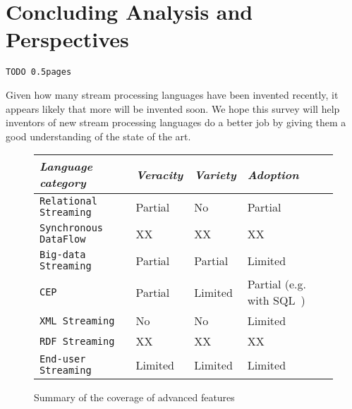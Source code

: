 \section{Concluding Analysis and Perspectives}\label{sec:conclusion}

\begin{alltt}TODO\scriptsize ~0.5 pages
\end{alltt}


Given how many stream processing languages have been invented recently, it appears likely that more will be invented soon. We hope this survey will help inventors of new stream processing languages do a better job by giving them a good understanding of the state of the art.

\begin{figure*}\centering%
\begin{tabular}{| l | l | l | l |}\hline
{\em Language category}
& {\em Veracity} & {\em Variety} & {\em Adoption} \\\hline\hline

{\tt Relational Streaming} & Partial \cite{ali_et_al_2009} & No & Partial \cite{jain_et_al_2008} \\\hline
{\tt Synchronous DataFlow}  & XX & XX & XX \\\hline
{\tt Big-data Streaming}  & Partial \cite{akidau_et_al_2013} & Partial \cite{hirzel_schneider_gedik_2017} & Limited \\\hline
{\tt CEP} & Partial \cite{chandramouli_goldstein_maier_2010} & Limited & Partial (e.g. with SQL~\cite{zemke_et_al_2007}) \\\hline
{\tt XML Streaming} & No & No & Limited\\\hline
{\tt RDF Streaming} & XX & XX & XX \\\hline
{\tt End-user Streaming} & Limited & Limited & Limited\\\hline
\end{tabular}
\vspace*{-0.2cm}
\caption{Summary of the coverage of advanced features}
\vspace*{-0.3cm}
\end{figure*} 
